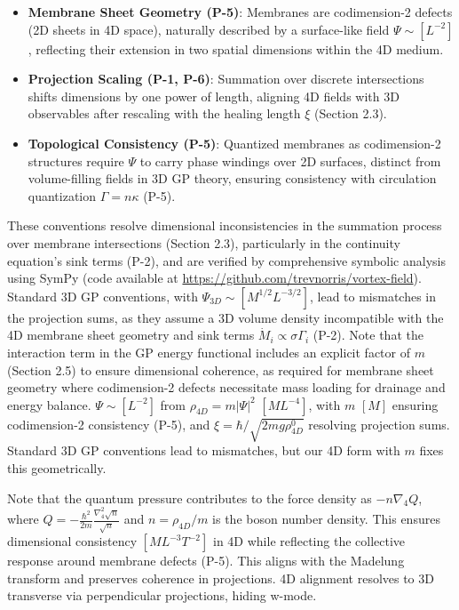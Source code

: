 \begin{itemize}
    \item \textbf{Membrane Sheet Geometry (P-5)}: Membranes are codimension-2 defects (2D sheets in 4D space), naturally described by a surface-like field $\Psi \sim [L^{-2}]$, reflecting their extension in two spatial dimensions within the 4D medium.
    \item \textbf{Projection Scaling (P-1, P-6)}: Summation over discrete intersections shifts dimensions by one power of length, aligning 4D fields with 3D observables after rescaling with the healing length $\xi$ (Section 2.3).
    \item \textbf{Topological Consistency (P-5)}: Quantized membranes as codimension-2 structures require $\Psi$ to carry phase windings over 2D surfaces, distinct from volume-filling fields in 3D GP theory, ensuring consistency with circulation quantization $\Gamma = n \kappa$ (P-5).
\end{itemize}

These conventions resolve dimensional inconsistencies in the summation process over membrane intersections (Section 2.3), particularly in the continuity equation's sink terms (P-2), and are verified by comprehensive symbolic analysis using SymPy (code available at \url{https://github.com/trevnorris/vortex-field}). Standard 3D GP conventions, with $\Psi_{3D} \sim [M^{1/2} L^{-3/2}]$, lead to mismatches in the projection sums, as they assume a 3D volume density incompatible with the 4D membrane sheet geometry and sink terms $\dot{M}_i \propto \sigma \Gamma_i$ (P-2). Note that the interaction term in the GP energy functional includes an explicit factor of $m$ (Section 2.5) to ensure dimensional coherence, as required for membrane sheet geometry where codimension-2 defects necessitate mass loading for drainage and energy balance. $\Psi \sim [L^{-2}]$ from $\rho_{4D} = m |\Psi|^2$ $[M L^{-4}]$, with $m$ $[M]$ ensuring codimension-2 consistency (P-5), and $\xi = \hbar / \sqrt{2 m g \rho_{4D}^0}$ resolving projection sums. Standard 3D GP conventions lead to mismatches, but our 4D form with $m$ fixes this geometrically.

Note that the quantum pressure contributes to the force density as $-n \nabla_4 Q$, where $Q = -\frac{\hbar^2}{2m} \frac{\nabla_4^2 \sqrt{n}}{\sqrt{n}}$ and $n = \rho_{4D}/m$ is the boson number density. This ensures dimensional consistency $[M L^{-3} T^{-2}]$ in 4D while reflecting the collective response around membrane defects (P-5). This aligns with the Madelung transform and preserves coherence in projections. 4D alignment resolves to 3D transverse via perpendicular projections, hiding w-mode.

